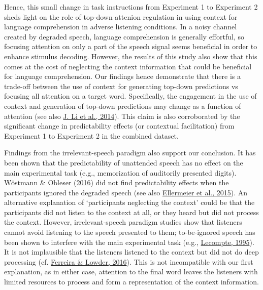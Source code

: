 \documentclass[a4paper, nobind]{templates/ociamthesis}
\begin{document}
Hence, this small change in task instructions from Experiment 1 to Experiment 2 sheds light on the role of top-down attenion regulation in using context for language comprehension in adverse listening conditions.
In a noisy channel created by degraded speech, language comprehension is generally effortful, so focusing attention on only a part of the speech signal seems beneficial in order to enhance stimulus decoding.
However, the results of this study also show that this comes at the cost of neglecting the context information that could be beneficial for language comprehension.
Our findings hence demonstrate that there is a trade-off between the use of context for generating top-down predictions vs focusing all attention on a target word.
Specifically, the engagement in the use of context and generation of top-down predictions may change as a function of attention (see also \protect\hyperlink{ref-Li2014}{J. Li et al., 2014}).
This claim is also corroborated by the significant change in predictability effects (or contextual facilitation) from Experiment 1 to Experiment 2 in the combined dataset.

Findings from the irrelevant-speech paradigm also support our conclusion.
It has been shown that the predictability of unattended speech has no effect on the main experimental task (e.g., memorization of auditorily presented digits).
Wöstmann \& Obleser (\protect\hyperlink{ref-Wostmann2016}{2016}) did not find predictability effects when the participants ignored the degraded speech (see also \protect\hyperlink{ref-Ellermeier2015}{Ellermeier et al., 2015}).
An alternative explanation of `participants neglecting the context' could be that the participants did not listen to the context at all,
or they heard but did not process the context.
However, irrelevant-speech paradigm studies show that listeners cannot avoid listening to the speech presented to them;
to-be-ignored speech has been shown to interfere with the main experimental task (e.g., \protect\hyperlink{ref-LeCompte1995}{Lecompte, 1995}).
It is not implausible that the listeners listened to the context but did not do deep processing (cf. \protect\hyperlink{ref-Ferreira2016}{Ferreira \& Lowder, 2016}).
This is not incompatible with our first explanation, as in either case, attention to the final word leaves the listeners with limited resources to process and form a representation of the context information.
\end{document}
